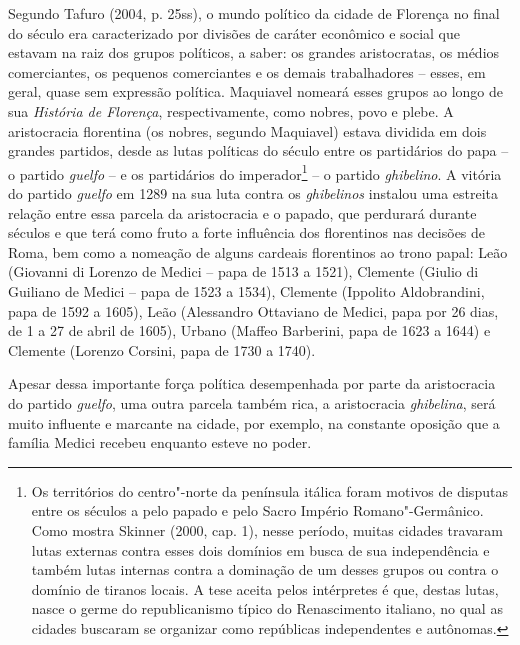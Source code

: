 Segundo Tafuro (2004, p. 25ss), o mundo político da cidade de Florença
no final do século  era caracterizado por divisões de caráter
econômico e social que estavam na raiz dos grupos políticos, a saber: os
grandes aristocratas, os médios comerciantes, os pequenos comerciantes e
os demais trabalhadores -- esses, em geral, quase sem expressão
política. Maquiavel nomeará esses grupos ao longo de sua \emph{História
de Florença}, respectivamente, como nobres, povo e plebe. A aristocracia
florentina (os nobres, segundo Maquiavel) estava dividida em dois
grandes partidos, desde as lutas políticas do século  entre os
partidários do papa -- o partido \emph{guelfo} -- e os partidários do
imperador\footnote{Os territórios do centro"-norte da península itálica
  foram motivos de disputas entre os séculos  a  pelo papado e pelo
  Sacro Império Romano"-Germânico. Como mostra Skinner (2000, cap. 1),
  nesse período, muitas cidades travaram lutas externas contra esses
  dois domínios em busca de sua independência e também lutas internas
  contra a dominação de um desses grupos ou contra o domínio de tiranos
  locais. A tese aceita pelos intérpretes é que, destas lutas, nasce o
  germe do republicanismo típico do Renascimento italiano, no qual as
  cidades buscaram se organizar como repúblicas independentes e
  autônomas.} -- o partido \emph{ghibelino}. A vitória do partido
\emph{guelfo} em 1289 na sua luta contra os \emph{ghibelinos} instalou
uma estreita relação entre essa parcela da aristocracia e o papado, que
perdurará durante séculos e que terá como fruto a forte influência dos
florentinos nas decisões de Roma, bem como a nomeação de alguns cardeais
florentinos ao trono papal: Leão  (Giovanni di Lorenzo de Medici --
papa de 1513 a 1521), Clemente  (Giulio di Guiliano de Medici -- papa
de 1523 a 1534), Clemente  (Ippolito Aldobrandini, papa de 1592 a
1605), Leão  (Alessandro Ottaviano de Medici, papa por 26 dias, de 1 a
27 de abril de 1605), Urbano  (Maffeo Barberini, papa de 1623 a
1644) e Clemente  (Lorenzo Corsini, papa de 1730 a 1740).

Apesar dessa importante força política desempenhada por parte da
aristocracia do partido \emph{guelfo}, uma outra parcela também rica, a
aristocracia \emph{ghibelina}, será muito influente e marcante na
cidade, por exemplo, na constante oposição que a família Medici recebeu
enquanto esteve no poder.

